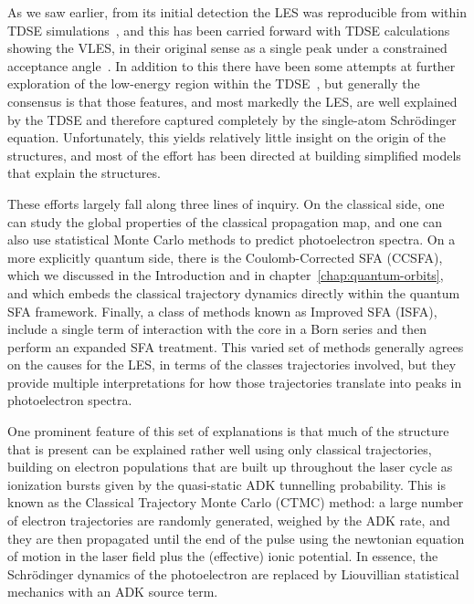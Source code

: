 
As we saw earlier, from its initial detection the LES was reproducible from within TDSE simulations~\cite{blaga_original_LES,catoire_angular-distributions_2009}, and this has been carried forward with TDSE calculations showing the VLES, in their original sense as a single peak under a constrained acceptance angle~\cite{VLES_characterization}. In addition to this there have been some attempts at further exploration of the low-energy region within the TDSE~\cite{telnov_TDSE_with_and_without_Coulomb, lemell_classicalquantum_2013}, but generally the consensus is that those features, and most markedly the LES, are well explained by the TDSE and therefore captured completely by the single-atom Schrödinger equation. Unfortunately, this yields relatively little insight on the origin of the structures, and most of the effort has been directed at building simplified models that explain the structures.



These efforts largely fall along three lines of inquiry. On the classical side, one can study the global properties of the classical propagation map, and one can also use statistical Monte Carlo methods to predict photoelectron spectra. On a more explicitly quantum side, there is the Coulomb-Corrected SFA (CCSFA), which we discussed in the Introduction and in chapter~\ref{chap:quantum-orbits}, and which embeds the classical trajectory dynamics directly within the quantum SFA framework. Finally, a class of methods known as Improved SFA (ISFA), include a single term of interaction with the core in a Born series and then perform an expanded SFA treatment. This varied set of methods generally agrees on the causes for the LES, in terms of the classes trajectories involved, but they provide multiple interpretations for how those trajectories translate into peaks in photoelectron spectra.	



One prominent feature of this set of explanations is that much of the structure that is present can be explained rather well using only classical trajectories, building on electron populations that are built up throughout the laser cycle as ionization bursts given by the quasi-static ADK tunnelling probability. This is known as the Classical Trajectory Monte Carlo (CTMC) method: a large number of electron trajectories are randomly generated, weighed by the ADK rate, and they are then propagated until the end of the pulse using the newtonian equation of motion in the laser field plus the (effective) ionic potential. In essence, the Schrödinger dynamics of the photoelectron are replaced by Liouvillian statistical mechanics with an ADK source term.


